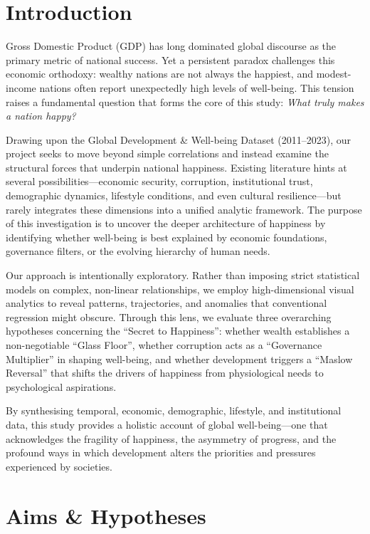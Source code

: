 \documentclass[conference]{IEEEtran}
\begin{document}
\section*{Introduction}
\noindent
Gross Domestic Product (GDP) has long dominated global discourse as the primary metric of national success. Yet a persistent paradox challenges this economic orthodoxy: wealthy nations are not always the happiest, and modest-income nations often report unexpectedly high levels of well-being. This tension raises a fundamental question that forms the core of this study: \emph{What truly makes a nation happy?}

Drawing upon the Global Development \& Well-being Dataset (2011--2023), our project seeks to move beyond simple correlations and instead examine the structural forces that underpin national happiness. Existing literature hints at several possibilities—economic security, corruption, institutional trust, demographic dynamics, lifestyle conditions, and even cultural resilience—but rarely integrates these dimensions into a unified analytic framework. The purpose of this investigation is to uncover the deeper architecture of happiness by identifying whether well-being is best explained by economic foundations, governance filters, or the evolving hierarchy of human needs.

Our approach is intentionally exploratory. Rather than imposing strict statistical models on complex, non-linear relationships, we employ high-dimensional visual analytics to reveal patterns, trajectories, and anomalies that conventional regression might obscure. Through this lens, we evaluate three overarching hypotheses concerning the ``Secret to Happiness'': whether wealth establishes a non-negotiable ``Glass Floor'', whether corruption acts as a ``Governance Multiplier'' in shaping well-being, and whether development triggers a ``Maslow Reversal'' that shifts the drivers of happiness from physiological needs to psychological aspirations.

By synthesising temporal, economic, demographic, lifestyle, and institutional data, this study provides a holistic account of global well-being—one that acknowledges the fragility of happiness, the asymmetry of progress, and the profound ways in which development alters the priorities and pressures experienced by societies.
\section*{Aims \& Hypotheses}
\end{document}
